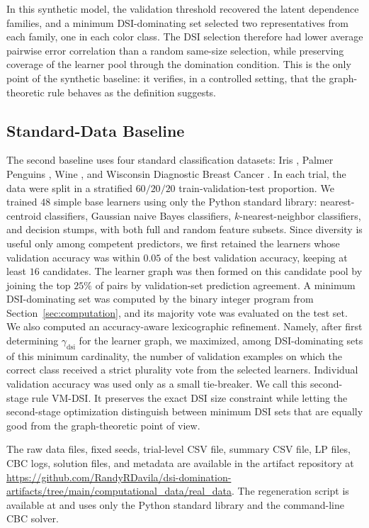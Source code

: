 \documentclass[11pt]{article}
\theoremstyle{definition}
\theoremstyle{remark}
\newcommand{\dsi}{\mathrm{dsi}}
\newcommand{\ArtifactRealDataDir}{\url{https://github.com/RandyRDavila/dsi-domination-artifacts/tree/main/computational_data/real_data}}
\begin{document}
In this synthetic model, the validation threshold recovered the latent
dependence families, and a minimum DSI-dominating set selected two
representatives from each family, one in each color class. The DSI selection
therefore had lower average pairwise error correlation than a random
same-size selection, while preserving coverage of the learner pool through
the domination condition. This is the only point of the synthetic baseline:
it verifies, in a controlled setting, that the graph-theoretic rule behaves
as the definition suggests.

\subsection{Standard-Data Baseline}

The second baseline uses four standard classification
datasets: Iris \cite{FisherUCI}, Palmer Penguins
\cite{HorstHillGorman20}, Wine \cite{AeberhardForinaUCI}, and Wisconsin
Diagnostic Breast Cancer \cite{WolbergMangasarianStreetUCI}. In each trial,
the data were split in a stratified \(60/20/20\) train-validation-test
proportion. We trained \(48\) simple base learners using only the Python
standard library: nearest-centroid classifiers, Gaussian naive Bayes
classifiers, \(k\)-nearest-neighbor classifiers, and decision stumps, with
both full and random feature subsets. Since diversity is useful only among
competent predictors, we first retained the learners whose validation
accuracy was within \(0.05\) of the best validation accuracy, keeping at
least \(16\) candidates. The learner graph was then formed on this candidate
pool by joining the top \(25\%\) of pairs by validation-set prediction
agreement. A minimum DSI-dominating set was computed by the binary integer
program from Section~\ref{sec:computation}, and its majority vote was
evaluated on the test set. We also computed an accuracy-aware
lexicographic refinement. Namely, after first determining
\(\gamma_{\dsi}\) for the learner graph, we maximized, among DSI-dominating
sets of this minimum cardinality, the number of validation examples on
which the correct class received a strict plurality vote from the selected
learners. Individual validation accuracy was used only as a small
tie-breaker. We call this second-stage rule VM-DSI. It preserves the exact
DSI size constraint while letting the
second-stage optimization distinguish between minimum DSI sets that are
equally good from the graph-theoretic point of view.

The raw data files, fixed seeds, trial-level CSV file, summary CSV file, LP
files, CBC logs, solution files, and metadata are available in the artifact
repository at \ArtifactRealDataDir. The regeneration script is available at
 and uses only the
Python standard library and the command-line CBC solver.
\end{document}
